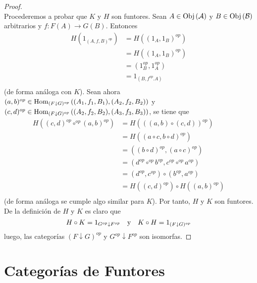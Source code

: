 \documentclass[12pt]{report}
\newcounter{it}
\theoremstyle{largebreak}
\newcommand\cf[3]{\ensuremath{#1:#2\rightarrow#3}}
\newcommand{\Obj}[1]{\ensuremath{\textup{Obj}\left(#1\right)}}
\newcommand{\Hom}[3]{\ensuremath{\textup{Hom}_{#1}\left(#2,#3\right)}}
\begin{document}
\begin{proof}
\begin{equation*}
        \end{equation*}
        Procederemos a probar que $K$ y $H$ son funtores. Sean $A\in\Obj{\mathcal{A}}$ y $B\in\Obj{\mathcal{B}}$ arbitrarios y $\cf{f}{F(A)}{G(B)}$. Entonces
        \begin{equation*}
            \begin{split}
                H(1_{(A,f,B)^{op}})&=H((1_A,1_B)^{op})\\
                &=H((1_A,1_B)^{op})\\
                &=(1_B^{op},1_A^{op})\\
                &=1_{(B,f^{op}.A)}\\
            \end{split}
        \end{equation*}
        (de forma análoga con $K$). Sean ahora $(a,b)^{op}\in\Hom{(F\downarrow G)^{op}}{(A_1,f_1,B_1)}{(A_2,f_2,B_2)}$ y $(c,d)^{op}\in\Hom{(F\downarrow G)^{op}}{(A_2,f_2,B_2)}{(A_3,f_3,B_3)}$, se tiene que
        \begin{equation*}
            \begin{split}
                H((c,d)^{op}\circ^{op}(a,b)^{op})&=H(((a,b)\circ (c,d))^{op})\\
                &=H((a\circ c,b\circ d)^{op})\\
                &=((b\circ d)^{op},(a\circ c)^{op})\\
                &=(d^{op}\circ^{op}b^{op},c^{op}\circ^{op}a^{op})\\
                &=(d^{op},c^{op})\circ(b^{op},a^{op})\\
                &=H((c,d)^{op})\circ H((a,b)^{op})\\
            \end{split}
        \end{equation*}
        (de forma análoga se cumple algo similar para $K$). Por tanto, $H$ y $K$ son funtores. De la definición de $H$ y $K$ es claro que
        \begin{equation*}
            H\circ K=1_{G^{op}\downarrow F^{op}}\quad\textup{y}\quad K\circ H=1_{(F\downarrow G)^{op}}
        \end{equation*}
        luego, las categorías $(F\downarrow G)^{op}$ y $G^{op}\downarrow F^{op}$ son isomorfas.
    \end{proof}

    \section{Categorías de Funtores}
\end{document}
